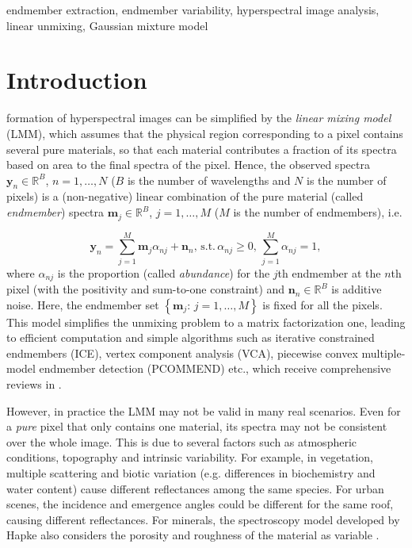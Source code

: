 \documentclass[twocolumn,english]{IEEEtran}
\theoremstyle{plain}
\begin{document}
\begin{IEEEkeywords}
endmember extraction, endmember variability, hyperspectral image analysis,
linear unmixing, Gaussian mixture model
\end{IEEEkeywords}


\section{Introduction}

\IEEEpubidadjcol

 formation of hyperspectral images can be simplified
by the \emph{linear mixing model} (LMM), which assumes that the physical
region corresponding to a pixel contains several pure materials, so
that each material contributes a fraction of its spectra based on
area to the final spectra of the pixel. Hence, the observed spectra
$\mathbf{y}_{n}\in\mathbb{R}^{B}$, $n=1,\dots,N$ ($B$ is the number
of wavelengths and $N$ is the number of pixels) is a (non-negative)
linear combination of the pure material (called \emph{endmember})
spectra $\mathbf{m}_{j}\in\mathbb{R}^{B}$, $j=1,\dots,M$ ($M$ is
the number of endmembers), i.e.

\begin{equation}
\mathbf{y}_{n}=\sum_{j=1}^{M}\mathbf{m}_{j}\alpha_{nj}+\mathbf{n}_{n},\,\text{s.t.}\,\alpha_{nj}\ge0,\,\sum_{j=1}^{M}\alpha_{nj}=1,\label{eq:LMM-1}
\end{equation}
where $\alpha_{nj}$ is the proportion (called \emph{abundance}) for
the $j$th endmember at the $n$th pixel (with the positivity and
sum-to-one constraint) and $\mathbf{n}_{n}\in\mathbb{R}^{B}$ is additive
noise. Here, the endmember set $\left\{ \mathbf{m}_{j}:\,j=1,\dots,M\right\} $
is fixed for all the pixels. This model simplifies the unmixing problem
to a matrix factorization one, leading to efficient computation and
simple algorithms such as iterative constrained endmembers (ICE),
vertex component analysis (VCA), piecewise convex multiple-model endmember
detection (PCOMMEND) \cite{berman2004ice,nascimento2005vertex,zare2013piecewise}
etc., which receive comprehensive reviews in \cite{bioucas2012hyperspectral,keshava2002spectral}.

However, in practice the LMM may not be valid in many real scenarios.
Even for a \emph{pure} pixel that only contains one material, its
spectra may not be consistent over the whole image. This is due to
several factors such as atmospheric conditions, topography and intrinsic
variability. For example, in vegetation, multiple scattering and biotic
variation (e.g. differences in biochemistry and water content) cause
different reflectances among the same species. For urban scenes, the
incidence and emergence angles could be different for the same roof,
causing different reflectances. For minerals, the spectroscopy model
developed by Hapke also considers the porosity and roughness of the
material as variable \cite{hapke1981bidirectional}.
\end{document}

